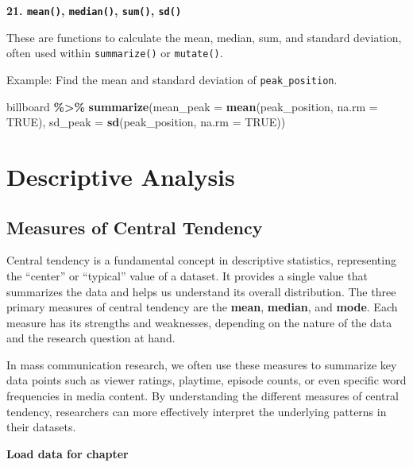 \documentclass[
]{book}
\newenvironment{Shaded}{\begin{snugshade}}{\end{snugshade}}
\newcommand{\AttributeTok}[1]{\textcolor[rgb]{0.13,0.29,0.53}{#1}}
\newcommand{\ConstantTok}[1]{\textcolor[rgb]{0.56,0.35,0.01}{#1}}
\newcommand{\FunctionTok}[1]{\textcolor[rgb]{0.13,0.29,0.53}{\textbf{#1}}}
\newcommand{\NormalTok}[1]{#1}
\newcommand{\SpecialCharTok}[1]{\textcolor[rgb]{0.81,0.36,0.00}{\textbf{#1}}}
\begin{document}
\textbf{21. \texttt{mean()}, \texttt{median()}, \texttt{sum()}, \texttt{sd()}}

These are functions to calculate the mean, median, sum, and standard deviation, often used within \texttt{summarize()} or \texttt{mutate()}.

Example: Find the mean and standard deviation of \texttt{peak\_position}.

\begin{Shaded}
\begin{Highlighting}[]
\NormalTok{billboard }\SpecialCharTok{\%\textgreater{}\%}
  \FunctionTok{summarize}\NormalTok{(}\AttributeTok{mean\_peak =} \FunctionTok{mean}\NormalTok{(peak\_position, }\AttributeTok{na.rm =} \ConstantTok{TRUE}\NormalTok{), }
            \AttributeTok{sd\_peak =} \FunctionTok{sd}\NormalTok{(peak\_position, }\AttributeTok{na.rm =} \ConstantTok{TRUE}\NormalTok{))}
\end{Highlighting}
\end{Shaded}

\chapter{Descriptive Analysis}\label{descriptive-analysis}

\section{Measures of Central Tendency}\label{measures-of-central-tendency}

Central tendency is a fundamental concept in descriptive statistics, representing the ``center'' or ``typical'' value of a dataset. It provides a single value that summarizes the data and helps us understand its overall distribution. The three primary measures of central tendency are the \textbf{mean}, \textbf{median}, and \textbf{mode}. Each measure has its strengths and weaknesses, depending on the nature of the data and the research question at hand.

In mass communication research, we often use these measures to summarize key data points such as viewer ratings, playtime, episode counts, or even specific word frequencies in media content. By understanding the different measures of central tendency, researchers can more effectively interpret the underlying patterns in their datasets.

\textbf{Load data for chapter}
\end{document}
